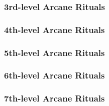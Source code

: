\subsubsection{3rd-level Arcane Rituals}
\begin{rituallist}
    \SLbinding[Abjur]
    \SLnondetection
    \SLcreateobject[Conj]
    \SLremotesenses[Div]
    \SLtelepathicbond
    \SLexplosiverunes[Evoc]
    \SLfiretrap
    \SLtinyhut
    \SLsecretpage[Trans]
    \SLanimatedead[Vivi]
    \SLspeakwithdead
    \SLitemattunement[Univ]
\end{rituallist}

\subsubsection{4th-level Arcane Rituals}
\begin{rituallist}
    \SLremovecurse[Abjur]
    \SLarcaneeye[Div]
    \SLdetectscrying
    \SLsending
    \SLtongues
    \SLhallucinatoryterrain[Illus]
    \SLfalsevision
\end{rituallist}

\subsubsection{5th-level Arcane Rituals}
\begin{rituallist}
    \SLbreakenchantment[Abjur]
    \SLdimensionallock
    \SLprivatesanctum
    \SLcontactotherplane[Div]
    \SLdream
    \SLlegendlore
    \SLscrying
    \SLsensorswarm
    \SLdream[Illus]
    \SLfabricate[Trans]
    \SLpasswall
\end{rituallist}

\subsubsection{6th-level Arcane Rituals}
\begin{rituallist}
    \SLplaneshift[Conj]
    \SLteleport
    \SLfindthepath[Div]
    \SLgeasquest[Ench]
    \SLoverlandflight
    \SLmoveearth[Trans]
\end{rituallist}

\subsubsection{7th-level Arcane Rituals}
\begin{rituallist}
    \SLclone[Conj]
    \SLinstantrefuge
    \SLmagnificentmansion
    \SLteleportobject
    \SLcontrolweather[Evoc]
    \SLprogrammedimage
    \SLsequester[Illus]
    \SLsequester[Trans]
\end{rituallist}

